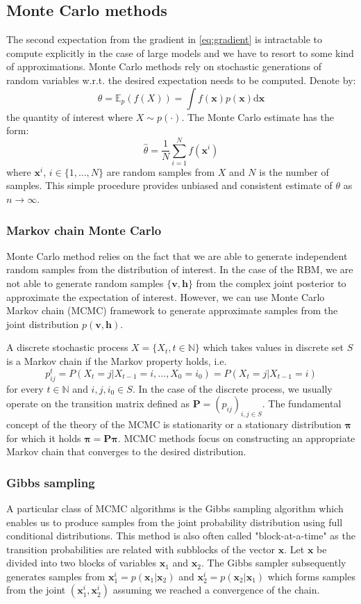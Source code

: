 \documentclass[../report/report.tex]{subfiles}
\begin{document}
\subsection{Monte Carlo methods}
The second expectation from the gradient in \ref{eq:gradient} is intractable to compute explicitly  in the case of large models and we have to resort to some kind of approximations. Monte Carlo methods rely on stochastic generations of random variables w.r.t. the desired expectation needs to be computed. Denote by:
$$ \theta = \mathbb{E}_p(f(X)) = \int f(\mathbf{x})p(\mathbf{x}) \text{d}\mathbf{x}$$
the quantity of interest where $X \sim p(\cdot)$. The Monte Carlo estimate has the form:
$$ \hat{\theta} = \frac{1}{N} \sum_{i=1}^N f(\mathbf{x}^i)$$
where $\mathbf{x}^i$, $i \in \{1,..., N\}$ are random samples from $X$ and $N$ is the number of samples. This simple procedure provides unbiased and consistent estimate of $\theta$ as $n \rightarrow \infty$.

\subsubsection{Markov chain Monte Carlo}
Monte Carlo method relies on the fact that we are able to generate independent random samples from the distribution of interest. In the case of the RBM, we are not able to generate random samples $\{ \mathbf{v,h} \}$ from the complex joint posterior to approximate the expectation of interest. However, we can use Monte Carlo Markov chain (MCMC) framework to generate approximate samples from the joint distribution $p( \mathbf{v,h} )$.

A discrete stochastic process $X = \{ X_t, t \in \mathbb{N} \}$ which takes values in discrete set $S$ is a Markov chain if the Markov property holds, i.e.
$$p_{ij}^t = P(X_t = j | X_{t-1} = i,  ..., X_{0} = i_0) = P(X_t = j | X_{t-1} = i)$$
for every $t \in \mathbb{N}$ and $i,j, i_0 \in S$. In the case of the discrete process, we usually operate on the transition matrix defined as $\mathbf{P} = (p_{ij})_{i,j \in S}$. The fundamental concept of the theory of the MCMC is stationarity or a stationary distribution $\mathbf{\pi}$ for which it holds $\mathbf{\pi} = \mathbf{P\pi}.$ MCMC methods focus on constructing an appropriate Markov chain that converges to the desired distribution.

\subsubsection{Gibbs sampling}
A particular class of MCMC algorithms is the Gibbs sampling algorithm which enables us to produce samples from the joint probability distribution using full conditional distributions. This method is also often called "block-at-a-time" as the transition probabilities are related with subblocks of the vector $\mathbf{x}$. Let $\mathbf{x}$ be divided into two blocks of variables $\mathbf{x}_1$ and $\mathbf{x}_2$. The Gibbs sampler subsequently generates samples from $\mathbf{x}_1^i = p(\mathbf{x}_1 | \mathbf{x}_2)$ and $\mathbf{x}_2^i = p(\mathbf{x}_2 | \mathbf{x}_1)$ which forms samples from the joint $(\mathbf{x}_1^i, \mathbf{x}_2^i)$ assuming we reached a convergence of the chain.
     
\end{document}
